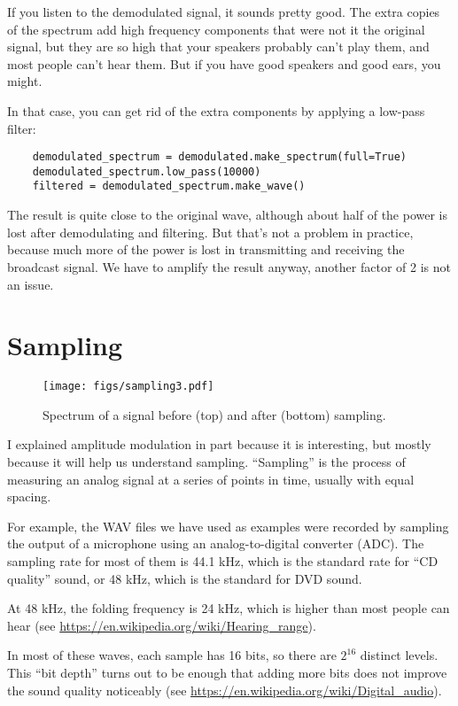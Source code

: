 If you listen to the demodulated signal, it sounds pretty good.  The
extra copies of the spectrum add high frequency components that were
not it the original signal, but they are so high that your speakers
probably can't play them, and most people can't hear them.  But if
you have good speakers and good ears, you might.

In that case, you can get rid of the extra components by applying a
low-pass filter:

\begin{verbatim}
	demodulated_spectrum = demodulated.make_spectrum(full=True)
	demodulated_spectrum.low_pass(10000)
	filtered = demodulated_spectrum.make_wave()
\end{verbatim}

The result is quite close to the original wave, although about half
of the power is lost after demodulating and filtering.  But that's not
a problem in practice, because much more of the power is lost in
transmitting and receiving the broadcast signal.  We have to amplify
the result anyway, another factor of 2 is not an issue.


\section{Sampling}

\begin{figure}
	\centerline{\texttt{[image: figs/sampling3.pdf]}}
	\caption{Spectrum of a signal before (top) and after (bottom) sampling.}
	\label{fig.sampling3}
\end{figure}

I explained amplitude modulation in part because it is interesting, but
mostly because it will help us understand sampling.  ``Sampling'' is
the process of measuring an analog signal at a series of points in
time, usually with equal spacing.

For example, the WAV files we have used as examples were
recorded by sampling the output of a microphone using an analog-to-digital
converter (ADC).  The sampling rate for most of them is 44.1 kHz,
which is the standard rate for ``CD quality'' sound, or 48 kHz, which
is the standard for DVD sound.

At 48 kHz, the folding frequency is 24 kHz, which is higher than most
people can hear (see \url{https://en.wikipedia.org/wiki/Hearing_range}).

In most of these waves, each sample has 16 bits, so there
are $2^{16}$ distinct levels.  This ``bit depth'' turns out to be enough
that adding more bits does not improve the sound quality noticeably
(see \url{https://en.wikipedia.org/wiki/Digital_audio}).

